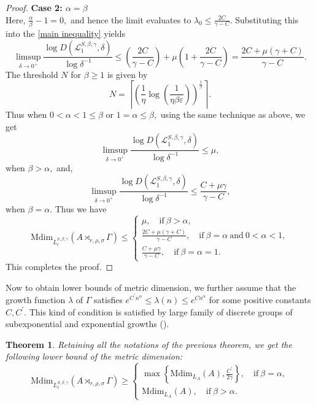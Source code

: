 \documentclass[a4paper,11pt,reqno]{amsart}
\theoremstyle{plain}
\newtheorem{thm}{Theorem}[section]
\theoremstyle{mainthmstyle}
\theoremstyle{named}
\numberwithin{equation}{section}
\begin{document}
\begin{proof}
\textbf{Case 2: $\alpha = \beta$} \\
Here, $\frac {\alpha} {\beta} - 1 = 0,$ and hence the limit evaluates to $\lambda_0 \leq \frac {2C} {\gamma - C}.$ Substituting this into the \eqref{main inequality} yields
$$\limsup\limits_{\delta \to 0^{+}} \frac {\log D \left (\mathcal L_1^{S, \beta, \gamma}, \delta \right )} {\log \delta^{-1}} \leq \left( \frac {2C} {\gamma - C} \right) + \mu \left( 1 + \frac {2C} {\gamma - C} \right) = \frac {2C + \mu(\gamma + C)} {\gamma - C}.$$
The threshold $N$ for $\beta \geq 1$ is given by $$N = \left\lceil \left(\frac {1} {\eta} \log \left (\frac {1} {\eta \beta \varepsilon} \right) \right )^{\frac{1}{\beta}} \right \rceil.$$ Thus when $0 < \alpha < 1 \leq \beta$ or $1 = \alpha \leq \beta,$ using the same technique as above, we get $$\limsup\limits_{\delta \to 0^{+}} \frac {\log D \left (\mathcal L_1^{S, \beta, \gamma}, \delta \right )} {\log \delta^{-1}} \leq \mu,$$ when $\beta > \alpha,$ and, $$\limsup\limits_{\delta \to 0^{+}} \frac {\log D \left (\mathcal L_1^{S, \beta, \gamma}, \delta \right )} {\log \delta^{-1}} \leq \frac {C + \mu \gamma} {\gamma - C},$$ when $\beta = \alpha.$
Thus we have $$\mathrm {Mdim}_{L_{\ell}^{S, \beta, \gamma}} \left (A \rtimes_{r, \rho, \sigma} \Gamma \right ) \leq \begin{cases} \mu, \quad \mathrm{if}\ \beta > \alpha, \\ \frac {2 C + \mu (\gamma + C)} {\gamma - C}, \quad \mathrm{if}\ \beta = \alpha\ \mathrm{and}\ 0 < \alpha < 1, \\ \frac {C + \mu \gamma} {\gamma - C}, \quad \mathrm{if}\ \beta = \alpha = 1. \end{cases}$$
This completes the proof.


\end{proof}
Now to obtain lower bounds of metric dimension, we further assume that the growth function $\lambda$ of $\Gamma$ satisfies $e^{C^{\prime}n^{\alpha}}\leq\lambda(n)\leq e^{Cn^{\alpha}}$ for some positive constants $C,C^{\prime}$. This kind of condition is satisfied by large family of discrete groups of subexponential and exponential growths (\cite{Bridson-Int-Growth}).

\begin{thm}
Retaining all the notations of the previous theorem, we get the following lower bound of the metric dimension: 
\begin{displaymath}\mathrm{Mdim}_{L_{\ell}^{S, \beta, \gamma}} \left (A \rtimes_{r, \rho, \sigma} \Gamma \right ) \geq \begin{cases} \max \left \{\mathrm{Mdim}_{L_A} (A),\frac {C^{\prime}} {2 \gamma} \right \}, \quad \mathrm{if}\ \beta = \alpha, \\ \mathrm{Mdim}_{L_A} (A), \quad \mathrm{if}\ \beta > \alpha. \end{cases}\end{displaymath}

\end{thm}
\end{document}
